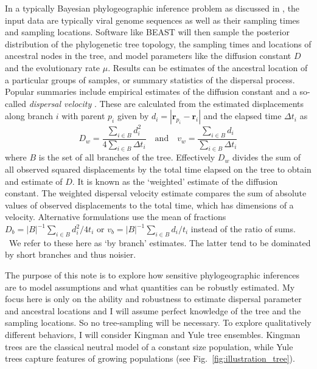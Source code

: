 \documentclass[aps,rmp, twocolumn]{revtex4}
\newcommand{\rvec}{\mathbf{r}}
\begin{document}
In a typically Bayesian phylogeographic inference problem as discussed in \citet{pybus_unifying_2012}, the input data are typically viral genome sequences as well as their sampling times and sampling locations.
Software like BEAST will then sample the posterior distribution of the phylogenetic tree topology, the sampling times and locations of ancestral nodes in the tree, and model parameters like the diffusion constant $D$ and the evolutionary rate $\mu$.
Results can be estimates of the ancestral location of a particular groups of samples, or summary statistics of the dispersal process.
Popular summaries include empirical estimates of the diffusion constant  \citep{pybus_unifying_2012} and a so-called \emph{dispersal velocity} \citep{dellicour_using_2017}. These are calculated from the estimated displacements along branch $i$ with parent $p_i$ given by $d_i = |\rvec_{p_i} - \rvec_{i}|$ and the elapsed time $\Delta t_i$ as
\begin{equation}
    D_w = \frac{\sum_{i\in B}d_i^2}{4\sum_{i\in B} \Delta t_i} \quad \mathrm{and}  \quad v_w = \frac{\sum_{i\in B} d_i}{\sum_{i\in B} \Delta t_i}
\end{equation}
where $B$ is the set of all branches of the tree.
Effectively $D_w$ divides the sum of all observed squared displacements by the total time elapsed on the tree to obtain and estimate of $D$.
It is known as the `weighted' estimate of the diffusion constant.
The weighted dispersal velocity estimate compares the sum of absolute values of observed displacements to the total time, which has dimensions of a velocity.
Alternative formulations use the mean of fractions $D_b = |B|^{-1} \sum_{i\in B}d_i^2/4t_i$ or $v_b = |B|^{-1} \sum_{i\in B}d_i/t_i$ instead of the ratio of sums. \
We refer to these here as `by branch' estimates. 
The latter tend to be dominated by short branches and thus noisier. 


The purpose of this note is to explore how sensitive phylogeographic inferences are to model assumptions and what quantities can be robustly estimated.
My focus here is only on the ability and robustness to estimate dispersal parameter and ancestral locations and I will assume perfect knowledge of the tree and the sampling locations.
So no tree-sampling will be necessary.
To explore qualitatively different behaviors, I will consider Kingman and Yule tree ensembles. Kingman trees are the classical neutral model of a constant size population, while Yule trees capture features of growing populations (see Fig.~\ref{fig:illustration_tree}).
\end{document}
